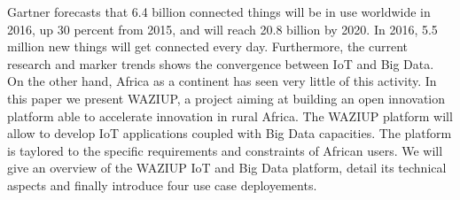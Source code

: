 
Gartner forecasts that 6.4 billion connected things will be in use worldwide in 2016, up 30 percent from 2015, and will reach 20.8 billion by 2020. In 2016, 5.5 million new things will get connected every day.
Furthermore, the current research  and marker trends shows the convergence between IoT and Big Data.
On the other hand, Africa as a continent has seen very little of this activity.
In this paper we present WAZIUP, a project aiming at building an open innovation platform able to accelerate innovation in rural Africa.
The WAZIUP platform will allow to develop IoT applications coupled with Big Data capacities.
The platform is taylored to the specific requirements and constraints of African users.
We will give an overview of the WAZIUP IoT and Big Data platform, detail its technical aspects and finally introduce four use case deployements.
